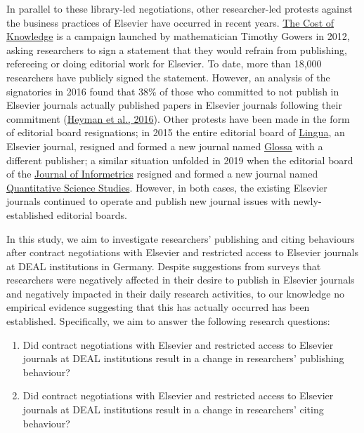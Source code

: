 \documentclass[
]{article}
\providecommand{\tightlist}{%
  \setlength{\itemsep}{0pt}\setlength{\parskip}{0pt}}
\begin{document}
In parallel to these library-led negotiations, other researcher-led protests against the business practices of Elsevier have occurred in recent years. \href{http://thecostofknowledge.com/}{The Cost of Knowledge} is a campaign launched by mathematician Timothy Gowers in 2012, asking researchers to sign a statement that they would refrain from publishing, refereeing or doing editorial work for Elsevier. To date, more than 18,000 researchers have publicly signed the statement. However, an analysis of the signatories in 2016 found that 38\% of those who committed to not publish in Elsevier journals actually published papers in Elsevier journals following their commitment (\href{https://doi.org/10.3389/frma.2016.00007}{Heyman et al., 2016}). Other protests have been made in the form of editorial board resignations; in 2015 the entire editorial board of \href{https://www.journals.elsevier.com/lingua}{Lingua}, an Elsevier journal, resigned and formed a new journal named \href{https://www.glossa-journal.org/}{Glossa} with a different publisher; a similar situation unfolded in 2019 when the editorial board of the \href{https://www.journals.elsevier.com/journal-of-informetrics}{Journal of Informetrics} resigned and formed a new journal named \href{https://direct.mit.edu/qss}{Quantitative Science Studies}. However, in both cases, the existing Elsevier journals continued to operate and publish new journal issues with newly-established editorial boards.

In this study, we aim to investigate researchers' publishing and citing behaviours after contract negotiations with Elsevier and restricted access to Elsevier journals at DEAL institutions in Germany. Despite suggestions from surveys that researchers were negatively affected in their desire to publish in Elsevier journals and negatively impacted in their daily research activities, to our knowledge no empirical evidence suggesting that this has actually occurred has been established. Specifically, we aim to answer the following research questions:

\begin{enumerate}
\def\labelenumi{\arabic{enumi}.}
\tightlist
\item
  Did contract negotiations with Elsevier and restricted access to Elsevier journals at DEAL institutions result in a change in researchers' publishing behaviour?
\item
  Did contract negotiations with Elsevier and restricted access to Elsevier journals at DEAL institutions result in a change in researchers' citing behaviour?
\end{enumerate}
\end{document}
